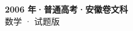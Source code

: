 \documentclass[zihao=-4, a4paper]{ctexart}
\begin{document}
\begin{center}
  {\Large\bfseries 2006 年·普通高考·安徽卷文科}\\[4pt]
  {\large 数学 · 试题版}
\end{center}
\medskip
{}

\end{document}

